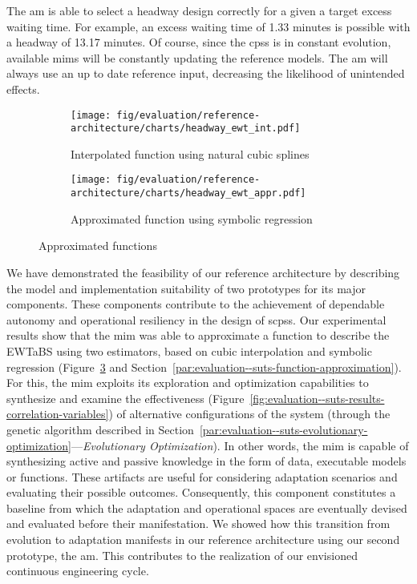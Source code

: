 The \gls{am} is able to select a headway design correctly for a given a target excess waiting time. For example, an excess waiting time of 1.33 minutes is possible with a headway of 13.17 minutes. Of course, since the \glspl{cps} is in constant evolution, available \glspl{mim} will be constantly updating the reference models. The \gls{am} will always use an up to date reference input, decreasing the likelihood of unintended effects.

\begin{figure}[h]
	\centering
	\begin{subfigure}[b]{0.49\textwidth}
		\centering
		\texttt{[image: fig/evaluation/reference-architecture/charts/headway\_ewt\_int.pdf]}
		\caption{Interpolated function using natural cubic splines}
		\label{fig:evaluation--suts-results-headway-ewt-interpolation}
	\end{subfigure}
	\begin{subfigure}[b]{0.49\textwidth}
		\centering
		\texttt{[image: fig/evaluation/reference-architecture/charts/headway\_ewt\_appr.pdf]}
		\caption{Approximated function using symbolic regression}
		\label{fig:evaluation--suts-results-headway-ewt-regression}
	\end{subfigure}
	\caption{Approximated functions}
	\label{fig:evaluation--suts-results-approximated-functions}
\end{figure}

We have demonstrated the feasibility of our reference architecture by describing the model and implementation suitability of two prototypes for its major components. These components contribute to the achievement of dependable autonomy and operational resiliency in the design of \glspl{scps}. Our experimental results show that the \gls{mim} was able to approximate a function to describe the \gls{EWTaBS} using two estimators, based on cubic interpolation and symbolic regression (\cf Figure~\ref{fig:evaluation--suts-results-approximated-functions} and Section~\ref{par:evaluation--suts-function-approximation}). For this, the \gls{mim} exploits its exploration and optimization capabilities to synthesize and examine the effectiveness (\cf Figure~\ref{fig:evaluation--suts-results-correlation-variables}) of alternative configurations of the system (\ie through the genetic algorithm described in Section~\ref{par:evaluation--suts-evolutionary-optimization}---\emph{Evolutionary Optimization}). In other words, the \gls{mim}  is capable of synthesizing active and passive knowledge in the form of data, executable models or functions. These artifacts are useful for considering adaptation scenarios and evaluating their possible outcomes. Consequently, this component constitutes a baseline from which the adaptation and operational spaces are eventually devised and evaluated before their manifestation. We showed how this transition from evolution to adaptation manifests in our reference architecture using our second prototype, the \gls{am}. This contributes to the realization of our envisioned continuous engineering cycle.


